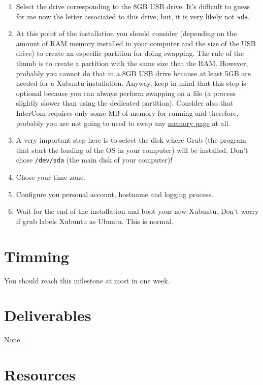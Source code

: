 \begin{enumerate}
\item Select the drive corresponding to the 8GB USB drive. It's
  difficult to guess for me now the letter associated to this drive,
  but, it is very likely not \texttt{sda}.

\item At this point of the installation you should consider (depending
  on the amount of RAM memory installed in your computer and the size
  of the USB drive) to create an especific partition for doing
  swapping. The rule of the thumb is to create a partition with the
  same size that the RAM. However, probably you cannot do that in a
  8GB USB drive because at least 5GB are needed for a Xubuntu
  installation. Anyway, keep in mind that this step is optional
  because you can always perform swapping on a file (a process
  slightly slower than using the dedicated partition). Consider also
  that InterCom requires only some MB of memory for running and
  therefore, probably you are not going to need to swap
  any \href{https://en.wikipedia.org/wiki/Page_(computer_memory)}{memory
  page} at all.

\item A very important step here is to select the disk where Grub (the
  program that start the loading of the OS in your computer) will be
  installed. Don't chose \texttt{/dev/sda} (the main disk of your
  computer)!

\item Chose your time zone.
  
\item Configure you personal account, hostname and logging process.
  
\item Wait for the end of the installation and boot your new
  Xubuntu. Don't worry if grub labels Xubuntu as Ubuntu. This is
  normal.
  
\end{enumerate}

\section{Timming}

You should reach this milestone at most in one week.

\section{Deliverables}

None.

\section{Resources}


